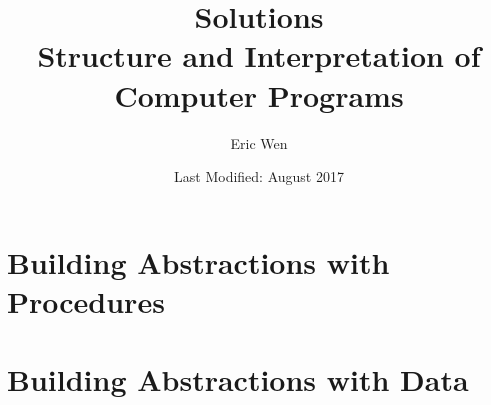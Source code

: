 \documentclass[a4paper]{report}
\begin{document}
\title{Solutions \\
\large Structure and Interpretation of Computer Programs}
\author{Eric Wen}
\date{Last Modified: August 2017}
\maketitle

\begin{multicols}{2}
  \tableofcontents
\end{multicols}

%
%

\chapter{Building Abstractions with Procedures}



%
%

\chapter{Building Abstractions with Data}



%
%


\end{document}
